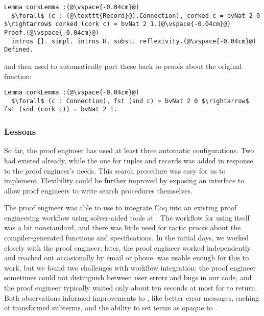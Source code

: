 \begin{lstlisting}
Lemma corkLemma :(@\vspace{-0.04cm}@)
  $\forall$ (c : (@\texttt{Record}@).Connection), corked c = bvNat 2 0 $\rightarrow$ corked (cork c) = bvNat 2 1.(@\vspace{-0.04cm}@)
Proof.(@\vspace{-0.04cm}@)
  intros []. simpl. intros H. subst. reflexivity.(@\vspace{-0.04cm}@)
Defined.
\end{lstlisting} %
and then used \toolname to automatically port these back to proofs about the original function:

\begin{lstlisting}[backgroundcolor=\color{cyan!30}]
Lemma corkLemma :(@\vspace{-0.04cm}@)
  $\forall$ (c : Connection), fst (snd c) = bvNat 2 0 $\rightarrow$ fst (snd (cork c)) = bvNat 2 1.
\end{lstlisting} %

\subsubsection{Lessons}

So far, the proof engineer has used at least three automatic configurations.
Two had existed already, while the one for tuples and records was
added in response to the proof engineer's needs.
This search procedure was easy for us to implement. %
Flexibility could be further improved by exposing an interface to allow proof engineers to
write search procedures themselves.

The proof engineer was able to use \toolname to integrate Coq into an existing proof engineering
workflow using solver-aided tools at \company.
The workflow for using \toolname itself was a bit nonstandard,
and there was little need for tactic proofs about the compiler-generated functions and specifications.
In the initial days, we worked closely with the proof engineer;
later, the proof engineer worked independently and reached out occasionally by email or phone.
\toolname was usable enough for this to work, but we found two challenges with workflow integration:
the proof engineer sometimes could not distinguish between user errors and bugs in our code,
and the proof engineer typically waited only about ten seconds at most for \toolname to return.
Both observations informed improvements to \toolname, like better error messages, caching of transformed subterms,
and the ability to set terms as opaque to \toolname.

